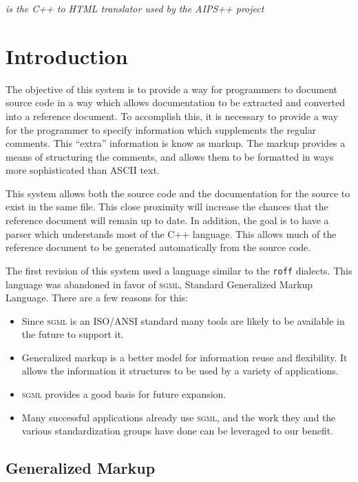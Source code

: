 \begin{htmlonly}
\textit{ is the C++ to HTML
translator used by the AIPS++ project}
\end{htmlonly}
\section{Introduction}

The objective of this system is to provide a way for programmers to
document source code in a way which allows documentation to be extracted and 
converted into a reference document. To accomplish this, it is necessary to 
provide a way for the programmer to specify information which supplements the 
regular comments. This ``extra'' information is know as markup. The 
markup provides a means of structuring the comments, and allows them 
to be formatted in ways more sophisticated than ASCII text. 

This system allows both the source code and the documentation for the source
to exist in the same file. This close proximity will increase the chances
that the reference document will remain up to date. In addition, the goal 
is to have a parser which understands most of the C++ language. This allows 
much of the reference document to be generated automatically from the 
source code.

The first revision of this system used a language similar to the \texttt{roff}
dialects. This language was abandoned in favor of \textsc{sgml}, Standard 
Generalized Markup Language. There are a few reasons for this:
\begin{itemize}
\item
Since \textsc{sgml} is an ISO/ANSI standard many tools are likely to be available
in the future to support it.
\item
Generalized markup is a better model for information reuse and flexibility.
It allows the information it structures to be used by a variety of 
applications.
\item
\textsc{sgml} provides a good basis for future expansion.
\item
Many successful applications already use \textsc{sgml}, and the work they and
the various standardization groups have done can be leveraged to our 
benefit.
\end{itemize}

\subsection{Generalized Markup}

